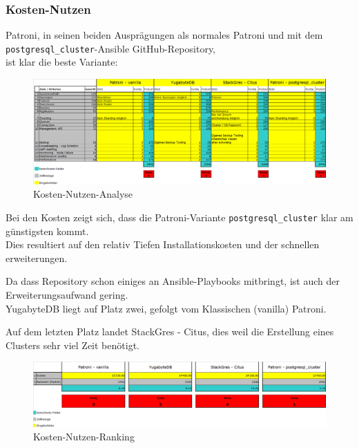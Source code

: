 
\begin{flushleft}
    \subsubsection{Kosten-Nutzen}
    Patroni, in seinen beiden Ausprägungen als normales Patroni und mit dem \texttt{postgresql\_cluster}-Ansible \Gls{GitHub}-Repository,\\
    ist klar die beste Variante:
    \begin{figure}[H]
        \centering
        \includegraphics[width=1\linewidth]{source/implementation/evaluation/solution_comparison/nutzwert_analyse}
        \caption{Kosten-Nutzen-Analyse}
        \label{fig:nutzwert_analyse}
    \end{figure}
\end{flushleft}
\begin{flushleft}
    Bei den Kosten zeigt sich, dass die Patroni-Variante \texttt{postgresql\_cluster} klar am günstigsten kommt.\\
    Dies resultiert auf den relativ Tiefen Installationskosten und der schnellen erweiterungen.
\end{flushleft}
\begin{flushleft}
    Da dass Repository schon einiges an Ansible-Playbooks mitbringt, ist auch der Erweiterungsaufwand gering.\\
    YugabyteDB liegt auf Platz zwei, gefolgt vom Klassischen (vanilla) Patroni.
\end{flushleft}
\begin{flushleft}
    Auf dem letzten Platz landet StackGres - Citus, dies weil die Erstellung eines Clusters sehr viel Zeit benötigt.
    \begin{figure}[H]
        \centering
        \includegraphics[width=1\linewidth]{source/implementation/evaluation/solution_comparison/cost_benefit_ranking}
        \caption{Kosten-Nutzen-Ranking}
        \label{fig:cost_benefit_ranking}
    \end{figure}
\end{flushleft}
